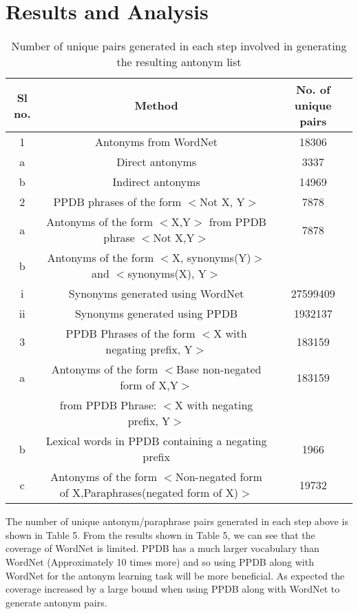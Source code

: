 \documentclass[11pt]{article}
\begin{document}
\section{ Results and Analysis}
\begin{table*}[h!]
 \begin{tabular}{|c | c | c|} 
 \hline
 Sl no. & Method & No. of unique pairs \\ [0.5ex]
 \hline\hline
 1 & Antonyms from WordNet & 18306\\
 a & Direct antonyms & 3337\\
 b & Indirect antonyms & 14969\\
 \hline
 2 & PPDB phrases of the form $<$Not X, Y$>$ & 7878\\
 a & Antonyms of the form $<$X,Y$>$ from PPDB phrase $<$Not X,Y$>$ & 7878\\
 b & Antonyms of the form $<$X, synonyms(Y)$>$ and $<$synonyms(X), Y$>$ &  \\
  i &  Synonyms generated using WordNet & 27599409\\
  ii & Synonyms generated using PPDB & 1932137\\
 \hline
 3 & PPDB Phrases of the form $<$X with negating prefix, Y$>$ & 183159\\
 a & Antonyms of the form $<$Base non-negated form of X,Y$>$ & 183159\\
  & from PPDB Phrase: $<$X with negating prefix, Y$>$ & \\
 b & Lexical words in PPDB containing a negating prefix
 & 1966\\ 
 c & Antonyms of the form $<$Non-negated form of X,Paraphrases(negated form of X)$>$ & 19732\\
 \hline
\end{tabular}
\caption{Number of unique pairs generated in each step involved in generating the resulting antonym list}
\end{table*}
The number of unique antonym/paraphrase pairs generated in each step above is shown in Table 5.
From the results shown in Table 5, we can see that the coverage of WordNet is limited. PPDB has a much larger vocabulary than WordNet (Approximately 10 times more) and so using PPDB along with WordNet for the antonym learning task will be more beneficial. As expected the coverage increased by a large bound when using PPDB along with WordNet to generate antonym pairs. 
\end{document}
